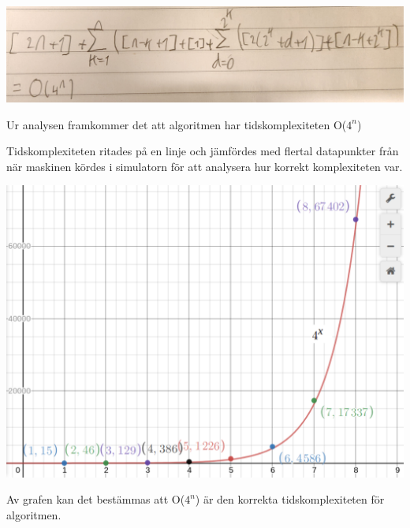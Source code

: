 \begin{center}
    \includegraphics[width=\linewidth]{bilder/komplexitet_utrakning.jpg}
\end{center}
Ur analysen framkommer det att algoritmen har tidskomplexiteten O($4^n$)

Tidskomplexiteten ritades på en linje och jämfördes med flertal datapunkter från när maskinen kördes i simulatorn för att analysera hur korrekt komplexiteten var. 
\begin{center}
    \includegraphics[width=\linewidth]{bilder/graf.png}
\end{center}
Av grafen kan det bestämmas att O($4^n$) är den korrekta tidskomplexiteten för algoritmen. 
